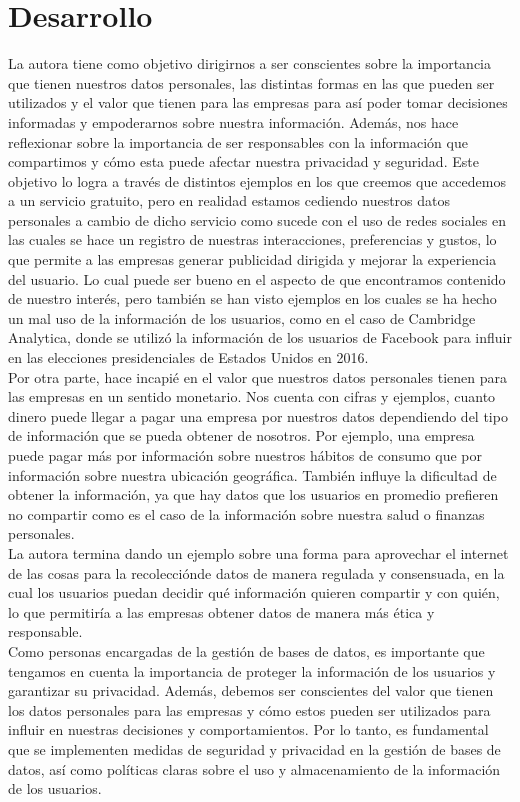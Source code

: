 \section*{Desarrollo}
La autora tiene como objetivo dirigirnos a ser conscientes sobre la importancia que tienen nuestros datos personales, las
distintas formas en las que pueden ser utilizados y el valor que tienen para las empresas para así poder tomar decisiones informadas
y empoderarnos sobre nuestra información. Además, nos hace reflexionar sobre la importancia de ser responsables con la información que compartimos y cómo esta puede afectar nuestra privacidad y seguridad.
Este objetivo lo logra a través de distintos ejemplos en los que creemos que accedemos a un servicio gratuito, pero en realidad 
estamos cediendo nuestros datos personales a cambio de dicho servicio como sucede con el uso de redes sociales en las cuales se
hace un registro de nuestras interacciones, preferencias y gustos, lo que permite a las empresas generar publicidad dirigida y
mejorar la experiencia del usuario. Lo cual puede ser bueno en el aspecto de que encontramos contenido de nuestro interés, pero
también se han visto ejemplos en los cuales se ha hecho un mal uso de la información de los usuarios, como en el caso de Cambridge
Analytica, donde se utilizó la información de los usuarios de Facebook para influir en las elecciones presidenciales de Estados Unidos en 2016.\cite{rosenberg2018asi}\\
Por otra parte, hace incapié en el valor que nuestros datos personales tienen para las empresas en un sentido monetario. Nos cuenta
con cifras y ejemplos, cuanto dinero puede llegar a pagar una empresa por nuestros datos dependiendo del tipo de información que se 
pueda obtener de nosotros. Por ejemplo, una empresa puede pagar más por información sobre nuestros hábitos de consumo que por información
sobre nuestra ubicación geográfica. También influye la dificultad de obtener la información, ya que hay datos que los usuarios en promedio
prefieren no compartir como es el caso de la información sobre nuestra salud o finanzas personales.\\
La autora termina dando un ejemplo sobre una forma para aprovechar el internet de las cosas para la recolecciónde datos de manera
regulada y consensuada, en la cual los usuarios puedan decidir qué información quieren compartir y con quién, lo que permitiría a las empresas
obtener datos de manera más ética y responsable. \\
Como personas encargadas de la gestión de bases de datos, es importante que tengamos en cuenta la importancia de proteger la información 
de los usuarios y garantizar su privacidad. Además, debemos ser conscientes del valor que tienen los datos personales para las empresas
y cómo estos pueden ser utilizados para influir en nuestras decisiones y comportamientos. Por lo tanto, es fundamental que se implementen
medidas de seguridad y privacidad en la gestión de bases de datos, así como políticas claras sobre el uso y almacenamiento de la información de los usuarios.

